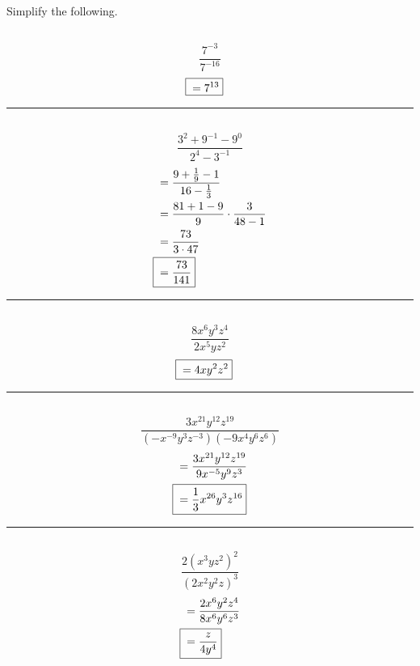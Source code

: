 


\section{}
	Simplify the following.

	\subsection{}
		\[\frac{7^{-3}}{7^{-16}}\]
		\begin{align*}
			\Aboxed{{} &= 7^{13}}
		\end{align*}
		\hrule{}

	\subsection{}
		\[\frac{3^2 + 9^{-1} - 9^0}{2^4 - 3^{-1}}\]
		\begin{align*}
			&= \frac{9 + \frac{1}{9} - 1}{16 - \frac{1}{3}} \\
			&= \frac{81 + 1 - 9}{9} \cdot \frac{3}{48 - 1} \\
			&= \frac{73}{3 \cdot 47} \\
			\Aboxed{{} &= \frac{73}{141}}
		\end{align*}
		\hrule{}

	\subsection{}
		\[\frac{8x^6y^3z^4}{2x^5yz^2}\]
		\begin{align*}
			\Aboxed{{} &= 4xy^2z^2}
		\end{align*}
		\hrule{}

	\subsection{}
		\[\frac{3x^{21}y^{12}z^{19}}{(-x^{-9}y^3z^{-3})(-9x^4y^6z^6)}\]
		\begin{align*}
			&= \frac{3x^{21}y^{12}z^{19}}{9x^{-5}y^9z^3} \\
			\Aboxed{{} &= \frac{1}{3}x^{26}y^3z^{16}}
		\end{align*}
		\hrule{}

	\subsection{}
		\[\frac{2{(x^3yz^2)}^2}{{(2x^2y^2z)}^3}\]
		\begin{align*}
			&= \frac{2x^6y^2z^4}{8x^6y^6z^3} \\
			\Aboxed{{} &= \frac{z}{4y^4}}
		\end{align*}

